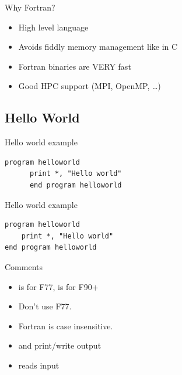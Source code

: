 \begin{frame}
  \begin{block}{Why Fortran?}\pause
  \begin{itemize}
    \item High level language
    \item Avoids fiddly memory management like in C
    \item Fortran binaries are VERY fast
    \item Good HPC support (MPI, OpenMP, \dots)
  \end{itemize}
  \end{block}
\end{frame}



\subsection{Hello World}

\begin{frame}[fragile]
\begin{block}{Hello world example}
\begin{lstlisting}[title=hello.f]
      program helloworld
      print *, "Hello world"
      end program helloworld
\end{lstlisting}
\end{block}
\end{frame}

\begin{frame}[fragile]
\begin{block}{Hello world example}
\begin{lstlisting}[title=hello.f90]
program helloworld
    print *, "Hello world"
end program helloworld
\end{lstlisting}
\end{block}
\end{frame}

\begin{frame}
  \begin{block}{Comments}
    \begin{itemize}
      \item {} is for F77,  is for F90+
      \item Don't use F77.
      \item Fortran is case insensitive.
      \item {} and  print/write output
      \item {} reads input
    \end{itemize}
  \end{block}
\end{frame}


